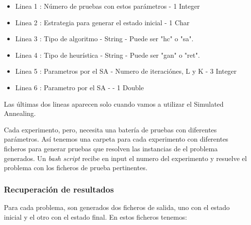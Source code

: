 \documentclass{article}
\begin{document}
\begin{itemize}
\item Linea 1 : Número de pruebas con estos parámetros - 1 Integer
\item Linea 2 : Estrategia para generar el estado inicial - 1 Char
\item Linea 3 : Tipo de algoritmo - String - Puede ser "hc" o "sa".
\item Linea 4 : Tipo de heurística - String - Puede ser "gan" o "ret".
\item Linea 5 : Parametros por el SA - Numero de iteraciónes, L y K - 3 Integer
\item Linea 6 : Parametro por el SA -  - 1 Double
\end{itemize}

Las últimas dos lineas aparecen solo cuando vamos a utilizar el Simulated Annealing. 

Cada experimento, pero, necesita una batería de pruebas con diferentes
parámetros. Así tenemos una carpeta para cada experimento con diferentes
ficheros para generar pruebas que resolven las instancias de el problema generados. Un {\it bash script} recibe en input el numero
del experimento y resuelve el problema con los ficheros de prueba pertinentes.

\subsubsection{Recuperación de resultados}

Para cada problema, son generados dos ficheros de salida, uno con el estado
inicial y el otro con el estado final. En estos ficheros tenemos:
\end{document}
